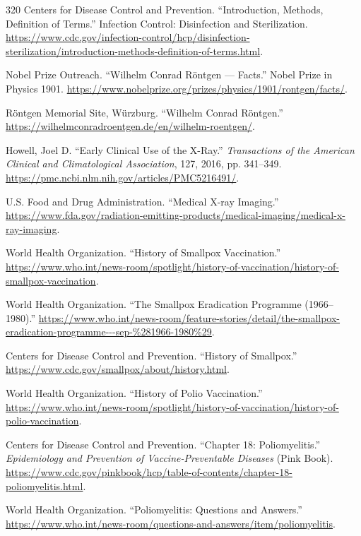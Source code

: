\documentclass[12pt,oneside]{book}
\begin{document}
\begin{thebibliography}{320}
Centers for Disease Control and Prevention. ``Introduction, Methods,
Definition of Terms.'' Infection Control: Disinfection and Sterilization.
\url{https://www.cdc.gov/infection-control/hcp/disinfection-sterilization/introduction-methods-definition-of-terms.html}.

Nobel Prize Outreach. ``Wilhelm Conrad R\"ontgen --- Facts.'' Nobel Prize in
Physics 1901. \url{https://www.nobelprize.org/prizes/physics/1901/rontgen/facts/}.

R\"ontgen Memorial Site, W\"urzburg. ``Wilhelm Conrad R\"ontgen.''
\url{https://wilhelmconradroentgen.de/en/wilhelm-roentgen/}.

Howell, Joel D. ``Early Clinical Use of the X-Ray.'' \emph{Transactions of
the American Clinical and Climatological Association}, 127, 2016,
pp. 341--349. \url{https://pmc.ncbi.nlm.nih.gov/articles/PMC5216491/}.

U.S. Food and Drug Administration. ``Medical X-ray Imaging.''
\url{https://www.fda.gov/radiation-emitting-products/medical-imaging/medical-x-ray-imaging}.

World Health Organization. ``History of Smallpox Vaccination.''
\url{https://www.who.int/news-room/spotlight/history-of-vaccination/history-of-smallpox-vaccination}.

World Health Organization. ``The Smallpox Eradication Programme (1966--1980).''
\url{https://www.who.int/news-room/feature-stories/detail/the-smallpox-eradication-programme---sep-%281966-1980%29}.

Centers for Disease Control and Prevention. ``History of Smallpox.''
\url{https://www.cdc.gov/smallpox/about/history.html}.

World Health Organization. ``History of Polio Vaccination.''
\url{https://www.who.int/news-room/spotlight/history-of-vaccination/history-of-polio-vaccination}.

Centers for Disease Control and Prevention. ``Chapter 18: Poliomyelitis.''
\emph{Epidemiology and Prevention of Vaccine-Preventable Diseases} (Pink
Book). \url{https://www.cdc.gov/pinkbook/hcp/table-of-contents/chapter-18-poliomyelitis.html}.

World Health Organization. ``Poliomyelitis: Questions and Answers.''
\url{https://www.who.int/news-room/questions-and-answers/item/poliomyelitis}.


\end{thebibliography}
\end{document}
